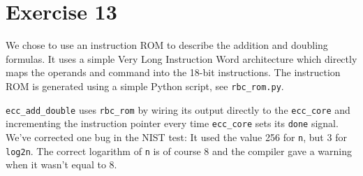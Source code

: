 \documentclass[a4paper,twoside]{article}
\newcommand{\atom}[1]{\mbox{\texttt{#1}}}
\begin{document}
\section*{Exercise 13}
We chose to use an instruction ROM to describe the addition and doubling
formulas. It uses a simple Very Long Instruction Word architecture which
directly maps the operands and command into the 18-bit instructions. The
instruction ROM is generated using a simple Python script, see
\atom{rbc\_rom.py}.

\atom{ecc\_add\_double} uses \atom{rbc\_rom} by wiring its output directly to
the \atom{ecc\_core} and incrementing the instruction pointer every time
\atom{ecc\_core} sets its \atom{done} signal. We've corrected one bug in the
NIST test: It used the value 256 for \atom{n}, but 3 for \atom{log2n}. The
correct logarithm of \atom{n} is of course 8 and the compiler gave a warning
when it wasn't equal to 8.
\end{document}
